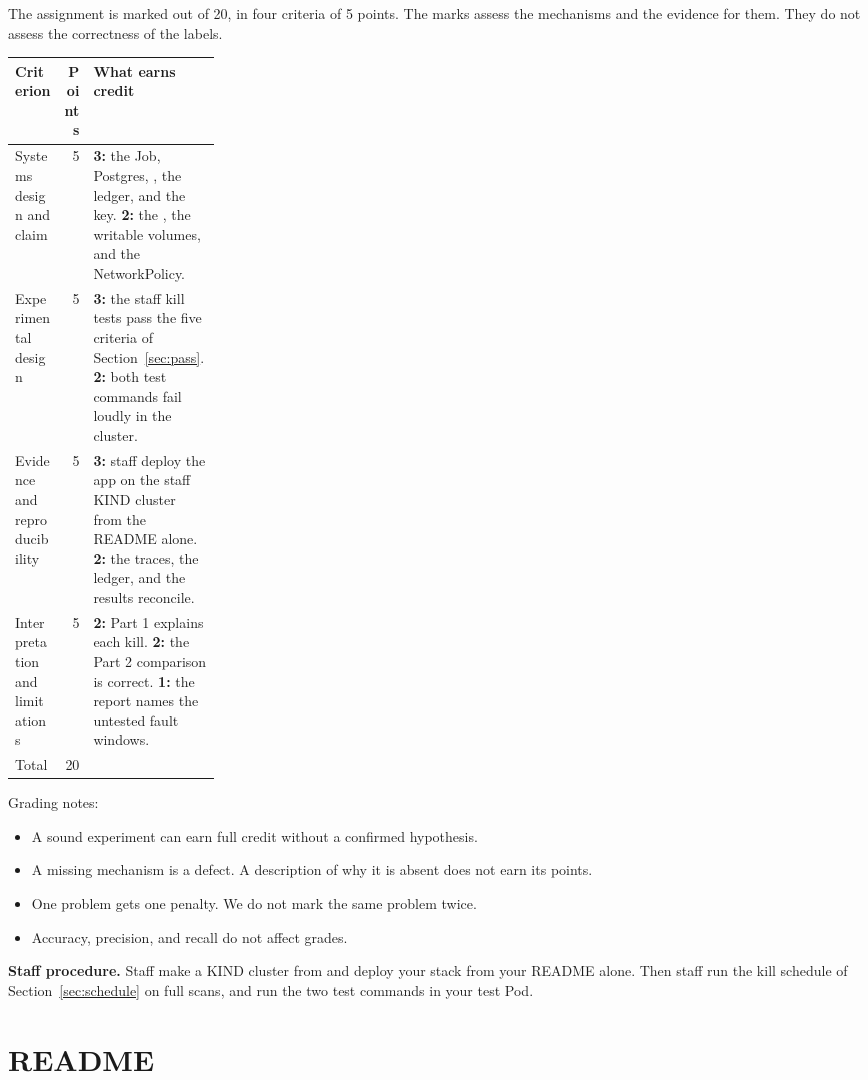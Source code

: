 \documentclass[9pt,letterpaper]{article}
\begin{document}
The assignment is marked out of 20, in four criteria of 5 points. The marks
assess the mechanisms and the evidence for them. They do not assess the
correctness of the labels.

{\small
\begin{xltabular}{\linewidth}{@{}>{\raggedright\arraybackslash}p{0.24\linewidth}r X@{}}
\toprule
Criterion & Points & What earns credit \\
\midrule
Systems design and claim & 5 & \textbf{3:} the Job, Postgres, ,
  the ledger, and the  key. \textbf{2:} the ,
  the writable volumes, and the NetworkPolicy. \\
Experimental design & 5 & \textbf{3:} the staff kill tests pass the five criteria
  of Section~\ref{sec:pass}. \textbf{2:} both test commands fail loudly in the
  cluster. \\
Evidence and reproducibility & 5 & \textbf{3:} staff deploy the app on the staff
  KIND cluster from the README alone. \textbf{2:} the traces, the ledger, and the
  results reconcile. \\
Interpretation and limitations & 5 & \textbf{2:} Part 1 explains each kill.
  \textbf{2:} the Part 2 comparison is correct. \textbf{1:} the report names the
  untested fault windows. \\
\midrule
Total & 20 & \\
\bottomrule
\end{xltabular}
}

Grading notes:
\begin{itemize}
\item A sound experiment can earn full credit without a confirmed hypothesis.
\item A missing mechanism is a defect. A description of why it is absent does
  not earn its points.
\item One problem gets one penalty. We do not mark the same problem twice.
\item Accuracy, precision, and recall do not affect grades.
\end{itemize}

\textbf{Staff procedure.} Staff make a KIND cluster from
 and deploy your stack from your README alone.
Then staff run the kill schedule of Section~\ref{sec:schedule} on full scans, and
run the two test commands in your test Pod.

\section{README}\label{sec:readme}
\end{document}
